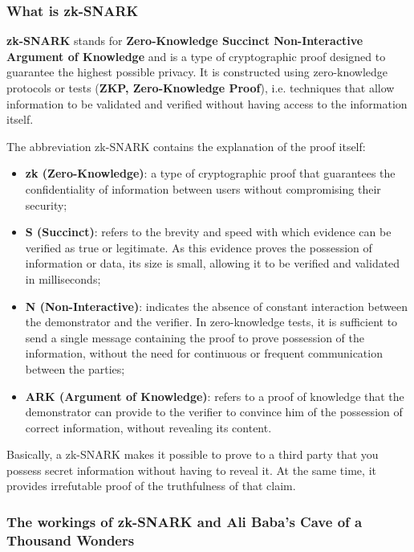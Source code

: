 \subsubsection{What is zk-SNARK}

\textbf{zk-SNARK} stands for \textbf{Zero-Knowledge Succinct Non-Interactive Argument of Knowledge} and is a type of cryptographic proof designed to guarantee the highest possible privacy. It is constructed using zero-knowledge protocols or tests (\textbf{ZKP, Zero-Knowledge Proof}), i.e. techniques that allow information to be validated and verified without having access to the information itself.

\noindent The abbreviation zk-SNARK contains the explanation of the proof itself:
\begin{itemize}
    \item \textbf{zk (Zero-Knowledge)}: a type of cryptographic proof that guarantees the confidentiality of information between users without compromising their security;
    \item \textbf{S (Succinct)}: refers to the brevity and speed with which evidence can be verified as true or legitimate. As this evidence proves the possession of information or data, its size is small, allowing it to be verified and validated in milliseconds;
    \item \textbf{N (Non-Interactive)}: indicates the absence of constant interaction between the demonstrator and the verifier. In zero-knowledge tests, it is sufficient to send a single message containing the proof to prove possession of the information, without the need for continuous or frequent communication between the parties;
    \item \textbf{ARK (Argument of Knowledge)}: refers to a proof of knowledge that the demonstrator can provide to the verifier to convince him of the possession of correct information, without revealing its content.
\end{itemize}

\noindent Basically, a zk-SNARK makes it possible to prove to a third party that you possess secret information without having to reveal it. At the same time, it provides irrefutable proof of the truthfulness of that claim. 

\subsubsection{The workings of zk-SNARK and Ali Baba's Cave of a Thousand Wonders}

